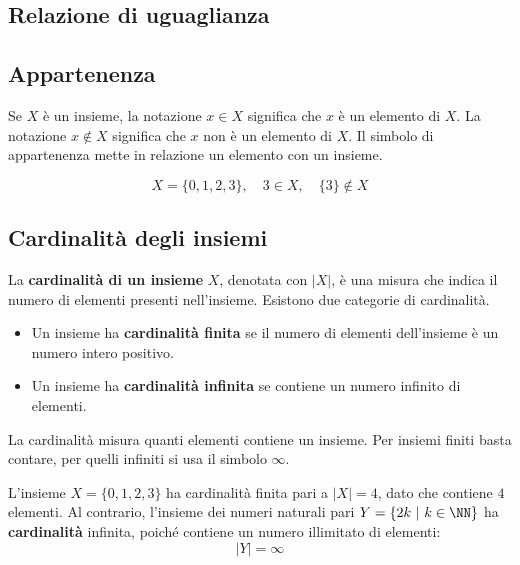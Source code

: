 \subsection{Relazione di uguaglianza}
\subsection{Appartenenza}

Se \( X \) è un insieme, la notazione \( x \in X \) significa che \( x \) è un elemento di \( X \).  
La notazione \( x \notin X \) significa che \( x \) non è un elemento di \( X \). Il simbolo di appartenenza mette in relazione un elemento con un insieme.


\[
X = \{0, 1, 2, 3\}, \quad 3 \in X, \quad \{3\} \notin X
\]

\subsection{Cardinalità degli insiemi}

La \textbf{cardinalità di un insieme} $X$, denotata con $|X|$, è una misura che indica il numero di elementi presenti nell'insieme.  
Esistono due categorie di cardinalità.
\begin{itemize}
    \item Un insieme ha \textbf{cardinalità finita} se il numero di elementi dell'insieme è un numero intero positivo.
    \item Un insieme ha \textbf{cardinalità infinita} se contiene un numero infinito di elementi.
\end{itemize}


La cardinalità misura quanti elementi contiene un insieme. Per insiemi finiti basta contare, per quelli infiniti si usa il simbolo \(\infty\). 




\begin{esempio}
L'insieme $X = \{0, 1, 2, 3\}$ ha cardinalità finita pari a $|X| = 4$, dato che contiene $4$ elementi.
Al contrario, l'insieme dei numeri naturali pari $Y = \{2k \ | \ k \in \NN\}$ ha \textbf{cardinalità} infinita, poiché contiene un numero illimitato di elementi:
\[
 |Y| = \infty
\]
\end{esempio}

